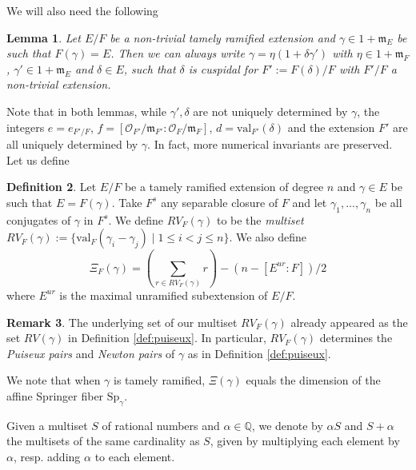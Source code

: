 \documentclass{amsart}
\numberwithin{equation}{section}
\newtheorem{lemma}{Lemma}[section]
\theoremstyle{definition}
\newtheorem{remark}[lemma]{Remark}%
\newtheorem{definition}[lemma]{Definition}%
\def\val{\mathrm{val}}
\def\Sp{{\mathrm{Sp}}}
\newcommand{\cO}{\mathcal{O}}
\newcommand{\fm}{\mathfrak{m}}
\newcommand{\Z}{{\mathbb Z}}
\newcommand{\Q}{{\mathbb Q}}
\begin{document}
We will also need the following \cite[VII 4.]{W2}
\begin{lemma}
\label{lem:factoreta}
Let $E/F$ be a non-trivial tamely ramified extension and $\gamma\in 1+\mathfrak{m}_E$ be such that $F(\gamma)=E$. Then we can always write $\gamma=\eta(1+\delta\gamma')$ with $\eta\in 1+\mathfrak{m}_F$, $\gamma'\in 1+\mathfrak{m}_E$ and $\delta\in E$, such that $\delta$ is cuspidal for $F':=F(\delta)/F$ with $F'/F$ a non-trivial extension.\end{lemma}
Note that in both lemmas, while $\gamma', \delta$ are not uniquely determined by $\gamma$, the integers $e=e_{F'/F}$, $f=[\cO_{F'}/\fm_{F'}:\cO_F/\fm_F]$, $d=\val_{F'}(\delta)$ and the extension $F'$ are all uniquely determined by $\gamma$. In fact, more numerical invariants are preserved. Let us define
\begin{definition}
\label{def:RV}
Let $E/F$ be a tamely ramified extension of degree $n$ and $\gamma\in E$ be such that $E=F(\gamma)$. Take $F^s$ any separable closure of $F$ and let $\gamma_1,...,\gamma_n$ be all conjugates of $\gamma$ in $F^s$. We define $RV_F(\gamma)$ to be the {\em multiset} $RV_F(\gamma):=\{\val_F(\gamma_i-\gamma_j)\;|\;1\le i<j\le n\}$.
We also define  $$\Xi_F(\gamma) = \left(\sum_{r\in RV_F(\gamma)} r\right) - (n - [E^{ur}:F])/2$$ where $E^{ur}$ is the maximal unramified subextension of $E/F$.
\end{definition}
\begin{remark}
\label{rmk:dimspgamma}
The underlying set of our multiset $RV_F(\gamma)$ already appeared as the set $RV(\gamma)$ in Definition \ref{def:puiseux}. In particular, $RV_F(\gamma)$ determines the {\it Puiseux pairs} and {\it Newton pairs} of $\gamma$ as in Definition \ref{def:puiseux}.

We note that when $\gamma$ is tamely ramified, $\Xi(\gamma)$ equals the dimension of the affine Springer fiber $\Sp_\gamma$.
\end{remark}
Given a multiset $S$ of rational numbers and $\alpha\in \Q$, we denote by $\alpha S$ and $S+\alpha$ the multisets of the same cardinality as $S$, given by multiplying each element by $\alpha$, resp. adding $\alpha$ to each element. %
\end{document}
